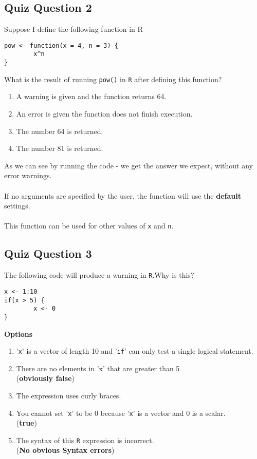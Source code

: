 \documentclass[12pt]{article}
\begin{document}
\subsection*{Quiz Question 2}
Suppose I define the following function in R
\begin{framed}
\begin{verbatim}
pow <- function(x = 4, n = 3) {
        x^n
}
\end{verbatim}
\end{framed}
What is the result of running
\texttt{pow()}
in \texttt{R} after defining this function?
\begin{enumerate}
\item A warning is given and the function returns 64.
\item An error is given the function does not finish execution.
\item The number 64 is returned.
\item The number 81 is returned.
\end{enumerate}

As we can see by running the code - we get the answer we expect, without any error warnings. \\ \\ If no arguments are specified by the user, the function will use the \textbf{default} settings. \\ \\ This function can be used for other values of \texttt{x} and \texttt{n}.


\newpage
\subsection*{Quiz Question 3}
The following code will produce a warning in \texttt{R}.Why is this?
\begin{framed}
\begin{verbatim}
x <- 1:10
if(x > 5) {
        x <- 0
}
\end{verbatim}
\end{framed}

\textbf{Options}
\begin{enumerate}
\item '\texttt{x}' is a vector of length 10 and '\texttt{if}' can only test a single logical statement.
\item There are no elements in 'x' that are greater than 5 \\ (\textbf{obviously false})
\item The expression uses curly braces.
\item You cannot set '\texttt{x}' to be 0 because '\texttt{x}' is a vector and 0 is a scalar. \\ (\textbf{true})
\item The syntax of this \texttt{R} expression is incorrect.\\ (\textbf{No obvious Syntax errors})
\end{enumerate}
\end{document}

